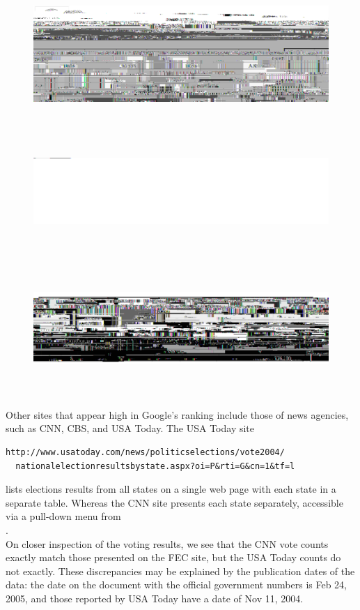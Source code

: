 \begin{figure}
\includegraphics[height=2in,width=6in]{electionMaps/officialElRes1.pdf}
\includegraphics[height=2in,width=6in]{electionMaps/officialElRes2.pdf}
\includegraphics[height=2in,width=6in]{electionMaps/officialElRes3.pdf}
\caption{ }
\label{fig:officialElRes}
\end{figure}
 
Other sites that appear high in Google's ranking include those
of news agencies, such as CNN, CBS, and USA Today.
The USA Today site 
\begin{verbatim}
http://www.usatoday.com/news/politicselections/vote2004/
  nationalelectionresultsbystate.aspx?oi=P&rti=G&cn=1&tf=l
\end{verbatim}
lists elections results from all
states on a single web page with each state in a separate table.
Whereas the CNN site presents each state separately, accessible
via a pull-down menu from\\
.\\ 
On closer inspection of the voting results, we see that the CNN vote
counts exactly match those presented on the FEC site,
but the USA Today counts do not exactly. 
These discrepancies may be explained by the publication
dates of the data: the date on the document with the official government 
numbers is Feb 24, 2005, and those reported by USA Today have a date of 
Nov 11, 2004.  

